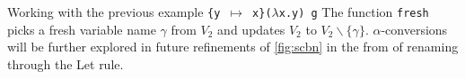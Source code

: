 Working with the previous example \texttt{\{y $\mapsto$ x\}($\lambda$x.y) g}
The function \texttt{fresh} picks a fresh variable name $\gamma$ from $V_2$ and updates $V_2$ to $V_2 \backslash \{\gamma\}$.
$\alpha$-conversions will be further explored in future refinements of \autoref{fig:scbn} in the from of renaming through the Let rule.
\\

